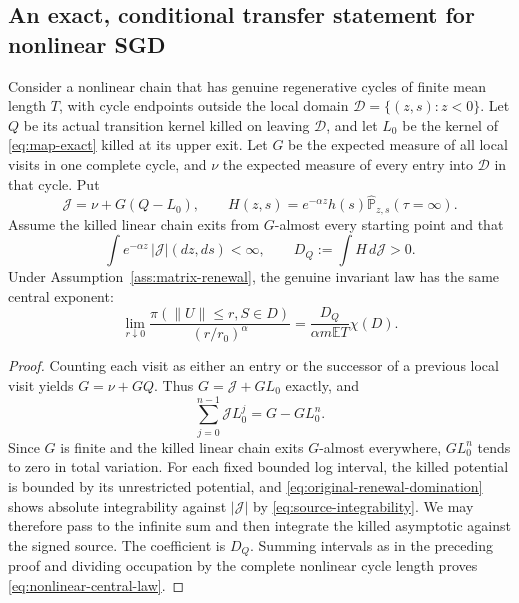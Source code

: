 \subsection{An exact, conditional transfer statement for nonlinear SGD}
\begin{proposition}
\label{prop:nonlinear-transfer}
Consider a nonlinear chain that has genuine regenerative cycles of
finite mean length $T$, with cycle endpoints outside the local domain
$\mathcal D=\{(z,s):z<0\}$. Let $Q$ be its actual transition kernel
killed on leaving $\mathcal D$, and let $L_0$ be the kernel of
\eqref{eq:map-exact} killed at its upper exit. Let $G$ be the expected
measure of all local visits in one complete cycle, and $\nu$ the
expected measure of every entry into $\mathcal D$ in that cycle. Put
\begin{equation}
 \mathcal J=\nu+G(Q-L_0),\qquad
 H(z,s)=e^{-\alpha z}h(s)
       \widehat{\mathbb P}_{z,s}(\tau=\infty).
 \label{eq:nonlinear-source}
\end{equation}
Assume the killed linear chain exits from $G$-almost every starting
point and that
\begin{equation}
 \int e^{-\alpha z}\,|\mathcal J|(dz,ds)<\infty,
 \qquad D_Q:=\int H\,d\mathcal J>0.
 \label{eq:source-integrability}
\end{equation}
Under Assumption~\ref{ass:matrix-renewal}, the genuine invariant law
has the same central exponent:
\begin{equation}
 \lim_{r\downarrow0}
 \frac{\pi(\|U\|\le r,S\in D)}{(r/r_0)^\alpha}
 = \frac{D_Q}{\alpha m\mathbb ET}\chi(D).
 \label{eq:nonlinear-central-law}
\end{equation}
\end{proposition}
\begin{proof}
Counting each visit as either an entry or the successor of a previous
local visit yields $G=\nu+GQ$. Thus $G=\mathcal J+GL_0$ exactly, and
\[
 \sum_{j=0}^{n-1}\mathcal J L_0^j=G-GL_0^n.
\]
Since $G$ is finite and the killed linear chain exits $G$-almost
everywhere, $GL_0^n$ tends to zero in total variation. For each fixed
bounded log interval, the killed potential is bounded by its
unrestricted potential, and \eqref{eq:original-renewal-domination}
shows absolute integrability against $|\mathcal J|$ by
\eqref{eq:source-integrability}. We may therefore pass to the infinite
sum and then integrate the killed asymptotic against the signed source.
The coefficient is $D_Q$. Summing intervals as in the preceding proof
and dividing occupation by the complete nonlinear cycle length proves
\eqref{eq:nonlinear-central-law}.
\end{proof}

